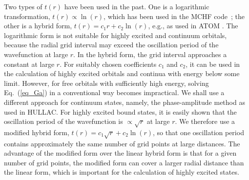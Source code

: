 Two types of $t(r)$ have been used in the past. One is a logarithmic
transformation, $t(r) \propto \ln(r)$, which has been used in the MCHF
code~\cite{fischer:1997a}; the other is a hybrid form, $t(r) = c_1 r + c_2
\ln(r)$, e.g., as used in ATOM \cite{amusia:1997a}. The logarithmic form is not
suitable for  highly excited and continuum orbitals, because the radial grid
interval may exceed the oscillation period of the wavefunction at large $r$. In
the hybrid form, the grid interval approaches a constant at large $r$. For
suitably chosen coefficients $c_1$ and $c_2$, it can be used in the calculation
of highly excited orbitals and continua with energy below some limit. However,
for free orbitals with sufficiently high energy, solving Eq.~(\ref{eq_Ga}) in a
conventional way becomes impractical. We shall use a different approach for
continuum states, namely, the phase-amplitude method as used in HULLAC. For
highly excited bound states, it is easily shown that the oscillation period of
the  wavefunction is $\propto \sqrt{r}$ at large $r$. We therefore use a
modified hybrid form, $t(r) = c_1\sqrt{r} + c_2\ln(r)$, so that  one oscillation
period contains approximately the same number of grid points at large distances.
The advantage of the modified form over the linear hybrid form is that for a
given number of grid points, the modified form can cover a larger radial
distance than the linear form, which is important for the calculation of highly
excited states. 

